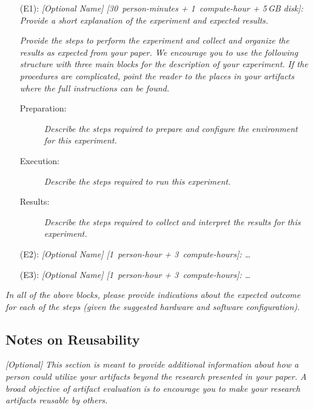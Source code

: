 \documentclass[sigconf]{acmart}
\begin{document}
\bigskip
\begin{itemize}
\item[(E1):]
  \emph{[Optional Name] [30~person-minutes + 1~compute-hour + 5\,GB
    disk]: Provide a short explanation of the experiment and expected
  results.}

  \emph{Provide the steps to perform the experiment and collect and
  organize the results as expected from your paper.  We encourage you
  to use the following structure with three main blocks for the
  description of your experiment.  If the procedures are complicated,
  point the reader to the places in your artifacts where the full
  instructions can be found.}

  \begin{description}
  \item[Preparation:] \emph{Describe the steps required to prepare and
  configure the environment for this experiment.}

  \item[Execution:] \emph{Describe the steps required to run this
  experiment.}

  \item[Results:] \emph{Describe the steps required to collect and
  interpret the results for this experiment.}
  \end{description}

\item[(E2):] \emph{[Optional Name] [1~person-hour + 3~compute-hours]: \ldots}

\item[(E3):] \emph{[Optional Name] [1~person-hour + 3~compute-hours]: \ldots}
\end{itemize}
\bigskip

\emph{In all of the above blocks, please provide indications about the
expected outcome for each of the steps (given the suggested hardware
and software configuration).}


\subsection{Notes on Reusability}

\emph{[Optional]}
%
\emph{This section is meant to provide additional information about
how a person could utilize your artifacts beyond the research
presented in your paper.  A broad objective of artifact evaluation is
to encourage you to make your research artifacts reusable by others.}
\end{document}
